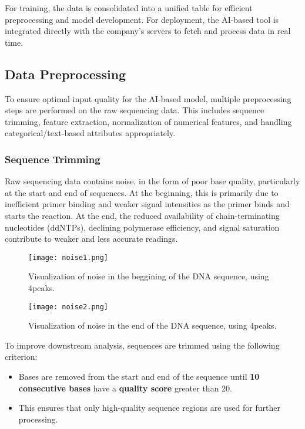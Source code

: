 For training, the data is consolidated into a unified table for efficient preprocessing and model development. For deployment, the AI-based tool is integrated directly with the company's servers to fetch and process data in real time.

\subsection{Data Preprocessing}

To ensure optimal input quality for the AI-based model, multiple preprocessing steps are performed on the raw sequencing data. This includes sequence trimming, feature extraction, normalization of numerical features, and handling categorical/text-based attributes appropriately.

\subsubsection{Sequence Trimming}
Raw sequencing data contains noise, in the form of poor base quality, particularly at the start and end of sequences. At the beginning, this is primarily due to inefficient primer binding and weaker signal intensities as the primer binds and starts the reaction. At the end, the reduced availability of chain-terminating nucleotides (ddNTPs), declining polymerase efficiency, and signal saturation contribute to weaker and less accurate readings. \cite{sanger_method_original}

\begin{figure}[h]
  \centering
  \texttt{[image: noise1.png]}
  \caption{Visualization of noise in the beggining of the DNA sequence, using 4peaks.}
  \label{fig:noise1}
\end{figure}

\begin{figure}[h]
  \centering
  \texttt{[image: noise2.png]}
  \caption{Visualization of noise in the end of the DNA sequence, using 4peaks.}
  \label{fig:noise2}
\end{figure}

To improve downstream analysis, sequences are trimmed using the following criterion:

\begin{itemize}
    \item Bases are removed from the start and end of the sequence until \textbf{10 consecutive bases} have a \textbf{quality score} greater than 20.
    \item This ensures that only high-quality sequence regions are used for further processing.
\end{itemize}

